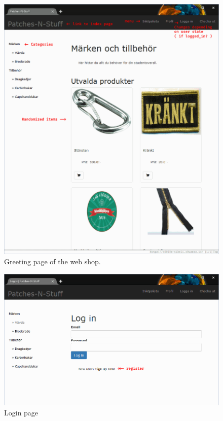 \documentclass[paper=a4, fontsize=11pt]{report} %
\begin{document}
\begin{figure}
	\includegraphics[width=0.9\paperwidth]{artifacts/stories/1_start.png}
	\caption{Greeting page of the web shop.}
	\label{fig:start}
\end{figure}

\begin{figure}
	\includegraphics[width=0.9\paperwidth]{artifacts/stories/2_login.png}
	\caption{Login page}
	\label{fig:login}
\end{figure}
\end{document}
